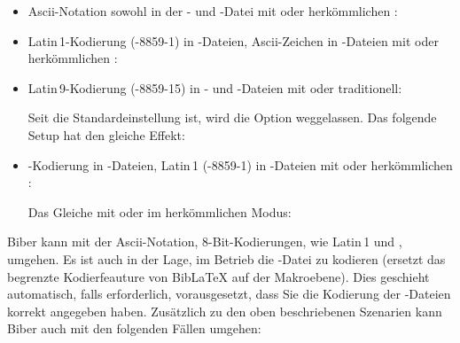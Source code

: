 \documentclass{ltxdockit}[2011/03/25]
\newcommand*{\biber}{Biber\xspace}
\newcommand*{\biblatex}{BibLaTeX\xspace}
\begin{document}
\begin{itemize} 
\setlength{\itemsep}{0pt}

\item Ascii-Notation sowohl in der - und -Datei mit \pdftex
oder herkömmlichen \tex: 

\begin{ltxexample} 
\usepackage{biblatex} 
\end{ltxexample}

\item Latin\,1-Kodierung (-8859-1) in -Dateien, Ascii-Zeichen
in -Dateien mit \pdftex oder herkömmlichen \tex:

\begin{ltxexample} 
\usepackage[latin1]{inputenc}
\usepackage[bibencoding=ascii]{biblatex} 
\end{ltxexample}

\item Latin\,9-Kodierung (-8859-15) in - und -Dateien mit \pdftex oder traditionell:

\begin{ltxexample} 
\usepackage[latin9]{inputenc}
\usepackage[bibencoding=auto]{biblatex} 
\end{ltxexample}
%
Seit  die Standardeinstellung ist, wird die Option
weggelassen. Das folgende Setup hat den gleiche Effekt:

\begin{ltxexample} 
\usepackage[latin9]{inputenc}
\usepackage{biblatex} 
\end{ltxexample}

\item {}-Kodierung in -Dateien, Latin\,1 (-8859-1)
in -Dateien mit \pdftex oder herkömmlichen \tex: 

\begin{ltxexample} 
\usepackage[utf8]{inputenc}
\usepackage[bibencoding=latin1]{biblatex} 
\end{ltxexample}

Das Gleiche mit \xetex oder \luatex im  herkömmlichen  Modus:

\begin{ltxexample} 
\usepackage[bibencoding=latin1]{biblatex}
\end{ltxexample}

\end{itemize}

\biber kann mit der Ascii-Notation, 8-Bit-Kodierungen, wie Latin\,1 und
, umgehen. Es ist auch in der Lage, im Betrieb die -Datei zu
kodieren (ersetzt das begrenzte Kodierfeauture von \biblatex auf der
Makroebene). Dies geschieht automatisch, falls erforderlich, vorausgesetzt, dass
Sie die Kodierung der -Dateien korrekt angegeben haben. Zusätzlich zu
den oben beschriebenen Szenarien kann Biber auch mit den folgenden Fällen
umgehen:
\end{document}
